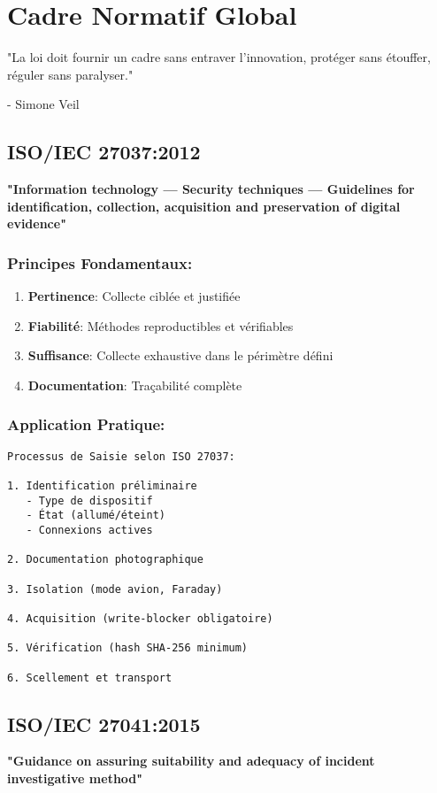 \chapter{Cadre Normatif Global}
\epigraph{"La loi doit fournir un cadre sans entraver l'innovation, protéger sans étouffer, réguler sans paralyser."}{- Simone Veil}
\section{ISO/IEC 27037:2012}
\textbf{"Information technology --- Security techniques --- Guidelines for identification, collection, acquisition and preservation of digital evidence"}

\subsection{Principes Fondamentaux:}
\begin{enumerate}
\item \textbf{Pertinence}: Collecte ciblée et justifiée
\item \textbf{Fiabilité}: Méthodes reproductibles et vérifiables
\item \textbf{Suffisance}: Collecte exhaustive dans le périmètre défini
\item \textbf{Documentation}: Traçabilité complète
\end{enumerate}

\subsection{Application Pratique:}
\begin{verbatim}
Processus de Saisie selon ISO 27037:

1. Identification préliminaire
   - Type de dispositif
   - État (allumé/éteint)
   - Connexions actives

2. Documentation photographique

3. Isolation (mode avion, Faraday)

4. Acquisition (write-blocker obligatoire)

5. Vérification (hash SHA-256 minimum)

6. Scellement et transport
\end{verbatim}

\section{ISO/IEC 27041:2015}
\textbf{"Guidance on assuring suitability and adequacy of incident investigative method"}

